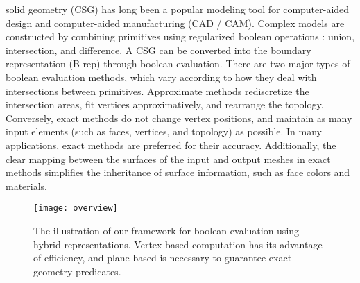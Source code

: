  solid geometry (CSG) has long been a popular modeling tool for computer-aided design and computer-aided manufacturing (CAD / CAM). Complex models are constructed by combining primitives using regularized boolean operations \cite{requicha1977mathematical,tilove1980closure}: union, intersection, and difference. A CSG can be converted into the boundary representation (B-rep) through boolean evaluation. There are two major types of boolean evaluation methods, which vary according to how they deal with intersections between primitives.
Approximate methods \cite{wang2011approximate,pavic2010hybrid,biermann2001approximate} rediscretize the intersection areas, fit vertices approximatively, and rearrange the topology.
Conversely, exact methods \cite{ogayar2015deferred,douze2015quickcsg,zhou2016mesh} do not change vertex positions, and maintain as many input elements (such as faces, vertices, and topology) as possible. In many applications, exact methods are preferred for their accuracy. Additionally, the clear mapping between the surfaces of the input and output meshes in exact methods simplifies the inheritance of surface information, such as face colors and materials.

\begin{figure*}
  \centering
  \texttt{[image: overview]}
  \caption{The illustration of our framework for boolean evaluation using hybrid representations. Vertex-based computation has its advantage of efficiency, and plane-based is necessary to guarantee exact geometry predicates. }\label{fig:hybrid}
\end{figure*}

